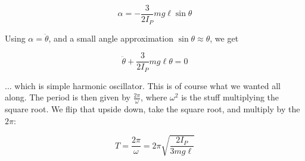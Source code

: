 \documentclass[12pt,a4paper]{report}
\begin{document}
\begin{equation}
\alpha = -\frac{3}{2 I_P} m g \ell \sin \theta
\end{equation}

Using $\alpha = \ddot{\theta}$, and a small angle approximation $\sin \theta \approx \theta$, we get

\begin{equation}
\ddot{\theta} + \frac{3}{2 I_P} m g \ell \theta = 0
\end{equation}

... which is simple harmonic oscillator. This is of course what we wanted all along. The period is then given by $\displaystyle \frac{2 \pi}{\omega}$, where $\omega^2$ is the stuff multiplying the square root. We flip that upside down, take the square root, and multiply by the $2 \pi$:

\begin{equation}
T = \frac{2 \pi}{\omega} = 2 \pi \sqrt{\frac{2 I_P}{3 m g \ell}}
\end{equation}
\end{document}
